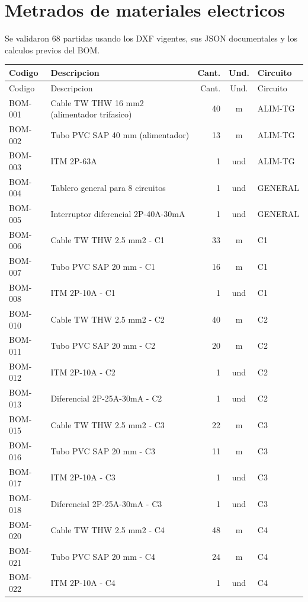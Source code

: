 \section{Metrados de materiales electricos}
Se validaron 68 partidas usando los DXF vigentes, sus JSON documentales y los calculos previos del BOM.
\begin{landscape}\scriptsize\begin{longtable}{p{1.7cm}p{9.0cm}r c p{1.8cm}}
\toprule Codigo & Descripcion & Cant. & Und. & Circuito \\ \midrule
\endfirsthead\toprule Codigo & Descripcion & Cant. & Und. & Circuito \\ \midrule\endhead
BOM-001 & Cable TW THW 16 mm2 (alimentador trifasico) & 40 & m & ALIM-TG \\
BOM-002 & Tubo PVC SAP 40 mm (alimentador) & 13 & m & ALIM-TG \\
BOM-003 & ITM 2P-63A & 1 & und & ALIM-TG \\
BOM-004 & Tablero general para 8 circuitos & 1 & und & GENERAL \\
BOM-005 & Interruptor diferencial 2P-40A-30mA & 1 & und & GENERAL \\
BOM-006 & Cable TW THW 2.5 mm2 - C1 & 33 & m & C1 \\
BOM-007 & Tubo PVC SAP 20 mm - C1 & 16 & m & C1 \\
BOM-008 & ITM 2P-10A - C1 & 1 & und & C1 \\
BOM-010 & Cable TW THW 2.5 mm2 - C2 & 40 & m & C2 \\
BOM-011 & Tubo PVC SAP 20 mm - C2 & 20 & m & C2 \\
BOM-012 & ITM 2P-10A - C2 & 1 & und & C2 \\
BOM-013 & Diferencial 2P-25A-30mA - C2 & 1 & und & C2 \\
BOM-015 & Cable TW THW 2.5 mm2 - C3 & 22 & m & C3 \\
BOM-016 & Tubo PVC SAP 20 mm - C3 & 11 & m & C3 \\
BOM-017 & ITM 2P-10A - C3 & 1 & und & C3 \\
BOM-018 & Diferencial 2P-25A-30mA - C3 & 1 & und & C3 \\
BOM-020 & Cable TW THW 2.5 mm2 - C4 & 48 & m & C4 \\
BOM-021 & Tubo PVC SAP 20 mm - C4 & 24 & m & C4 \\
BOM-022 & ITM 2P-10A - C4 & 1 & und & C4 \\

\end{longtable}
\end{landscape}
